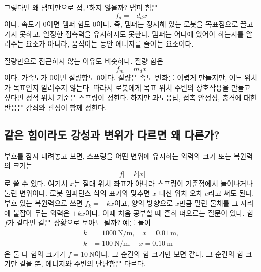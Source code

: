 그렇다면 왜 댐퍼만으로 접근하지 않을까?
댐퍼 힘은
\begin{equation}
  f_d=-d_d\dot{x}
\end{equation}
이다.
속도가 0이면 댐퍼 힘도 0이다.
즉, 댐퍼는 정지해 있는 로봇을 목표점으로 끌고 가지 못하고, 일정한 접촉력을 유지하지도 못한다.
댐퍼는 어디에 있어야 하는지를 알려주는 요소가 아니라, 움직이는 동안 에너지를 줄이는 요소이다.

질량만으로 접근하지 않는 이유도 비슷하다.
질량 힘은
\begin{equation}
  f_m=m_d\ddot{x}
\end{equation}
이다.
가속도가 0이면 질량항도 0이다.
질량은 속도 변화를 어렵게 만들지만, 어느 위치가 목표인지 알려주지 않는다.
따라서 로봇에게 목표 위치 주변의 상호작용을 만들고 싶다면 정적 위치 기준은 스프링이 정한다.
하지만 과도응답, 접촉 안정성, 충격에 대한 반응은 감쇠와 관성이 함께 정한다.

\subsection{같은 힘이라도 강성과 변위가 다르면 왜 다른가?}

부호를 잠시 내려놓고 보면, 스프링을 어떤 변위에 유지하는 외력의 크기 또는 복원력의 크기는
\begin{equation}
  |f|=k|x|
\end{equation}
로 쓸 수 있다.
여기서 $x$는 절대 위치 좌표가 아니라 스프링이 기준점에서 늘어나거나 눌린 변위이다.
로봇 임피던스 식의 표기와 맞추면 $x$ 대신 위치 오차 $e$라고 써도 된다.
부호 있는 복원력으로 쓰면 $f_k=-kx$이고, 양의 방향으로 $x$만큼 밀린 물체를 그 자리에 붙잡아 두는 외력은 $+kx$이다.
이때 처음 공부할 때 흔히 떠오르는 질문이 있다.
힘 $f$가 같다면 같은 상황으로 보아도 될까?
예를 들어
\begin{align}
  k&=1000~\mathrm{N/m}, \quad x=0.01~\mathrm{m}, \\
  k&=100~\mathrm{N/m}, \quad x=0.10~\mathrm{m}
\end{align}
은 둘 다 힘의 크기가 $f=10~\mathrm{N}$이다.
그 순간의 힘 크기만 보면 같다.
그 순간의 힘 크기만 같을 뿐, 에너지와 주변의 단단함은 다르다.

